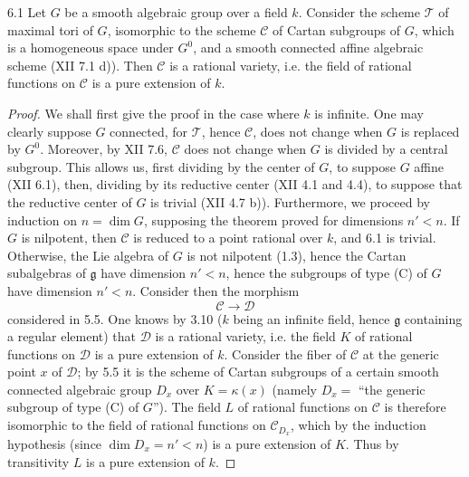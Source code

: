 \begin{theorem}{6.1}\label{XIV.6.1}
Let $G$ be a smooth algebraic group over a field $k$. Consider
the scheme $\mathscr T$ of maximal tori of $G$, isomorphic to
the scheme $\mathscr C$ of Cartan subgroups of $G$, which is
a homogeneous space under $G^0$, and a smooth connected affine
algebraic scheme (XII 7.1 d)). Then $\mathscr C$ is a rational
variety, i.e. the field of rational functions on $\mathscr C$
is a pure extension of $k$.
\end{theorem}
\begin{proof}
We shall first give the proof in the case where $k$ is
infinite. One may clearly suppose $G$ connected, for
$\mathscr T$, hence $\mathscr C$, does not change when
$G$ is replaced by $G^0$. Moreover, by XII 7.6,
$\mathscr C$ does not change when $G$ is divided by
a central subgroup. This allows us, first dividing
by the center of $G$, to suppose $G$ affine (XII
6.1), then, dividing by its reductive center (XII
4.1 and 4.4), to suppose that the reductive center
of $G$ is trivial (XII 4.7 b)). Furthermore, we
proceed by induction on $n=\dim G$, supposing the
theorem proved for dimensions $n'<n$. If $G$ is
nilpotent, then $\mathscr C$ is reduced to a point
rational over $k$, and 6.1 is trivial. Otherwise,
the Lie algebra of $G$ is not nilpotent (1.3),
hence the Cartan subalgebras of $\mathfrak g$
have dimension $n'<n$, hence the subgroups of
type (C) of $G$ have dimension $n'<n$. Consider
then the morphism
\[
 \mathscr C\longrightarrow\mathscr D
\]
considered in 5.5. One knows by 3.10 ($k$ being
an infinite field, hence $\mathfrak g$ containing
a regular element) that $\mathscr D$ is a
rational variety, i.e. the field $K$ of rational
functions on $\mathscr D$ is a pure extension
of $k$. Consider the fiber of $\mathscr C$ at
the generic point $x$ of $\mathscr D$; by 5.5
it is the scheme of Cartan subgroups of a
certain smooth connected algebraic group $D_x$
over $K=\kappa(x)$ (namely $D_x=$ ``the generic
subgroup of type (C) of $G$''). The field $L$
of rational functions on $\mathscr C$ is
therefore isomorphic to the field of rational
functions on $\mathscr C_{D_x}$, which by the
induction hypothesis (since $\dim D_x=n'<n$)
is a pure extension of $K$. Thus by transitivity
$L$ is a pure extension of $k$.


\end{proof}

